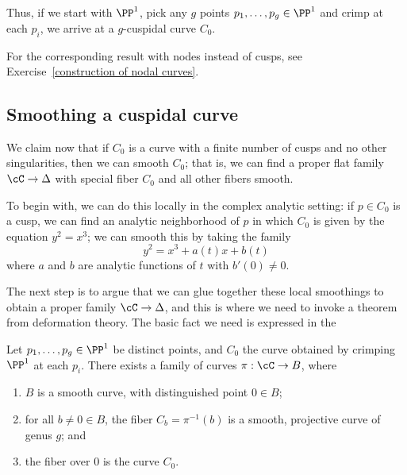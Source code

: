 Thus, if we start with $\PP^1$, pick any $g$ points $p_1,\dots, p_g \in \PP^1$ and crimp at each $p_i$, we arrive at a $g$-cuspidal curve $C_0$.

For the corresponding result with nodes instead of cusps, see Exercise~\ref{construction of nodal curves}. 

\subsection{Smoothing a cuspidal curve}  We claim now that if $C_0$ is a curve with a finite number of cusps and no other singularities, then we can smooth $C_0$; that is, we can find a proper flat family $\cC \to \Delta$ with special fiber $C_0$ and all other fibers smooth. 

To begin with, we can do this locally in the complex analytic setting: if $p \in C_0$ is a cusp, we can find an analytic neighborhood of $p$ in which $C_0$ is given by the equation $y^2 = x^3$; we can smooth this by taking the family
$$
y^2 = x^3 + a(t)x + b(t)
$$
where $a$ and $b$ are analytic functions of $t$ with $b'(0) \neq 0$.

The next step is to argue that we can glue together these local smoothings to obtain a proper family $\cC \to \Delta$, and this is where we need to invoke a theorem from deformation theory. The basic fact we need is expressed in the

\begin{lemma}\label{specialization to cuspidal curve}
Let $p_1,\dots,p_g \in \PP^1$ be distinct points, and $C_0$ the curve obtained by 
crimping $\PP^1$ at each $p_i$. There exists a family of curves $\pi : \cC \to B$, where
\begin{enumerate}
\item $B$ is a smooth curve, with distinguished point $0 \in B$;
\item for all $b \neq 0 \in B$, the fiber $C_b = \pi^{-1}(b)$ is a smooth, projective curve of genus $g$;  and
\item the fiber over $0$ is the curve $C_0$.
\end{enumerate}
\end{lemma}




